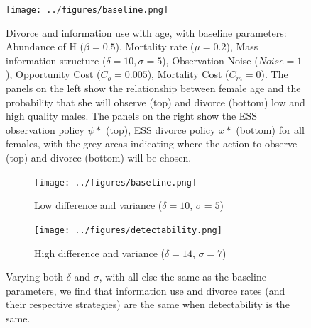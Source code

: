 \documentclass[10pt]{article} %
\begin{document}
\begin{figure}
\centering
\texttt{[image: ../figures/baseline.png]}
\caption{Divorce and information use with age, with baseline parameters: Abundance of H ($ \beta=0.5 $), Mortality rate ($ \mu=0.2 $), Mass information structure ($ \delta=10, \sigma=5 $), Observation Noise ($ Noise=1 $), Opportunity Cost ($ C_o=0.005 $), Mortality Cost ($ C_m=0 $). The panels on the left show the relationship between female age and the probability that she will observe (top) and divorce (bottom) low and high quality males. The panels on the right show the ESS observation policy $\psi*$ (top), ESS divorce policy $x*$ (bottom) for all females, with the grey areas indicating where the action to observe (top) and divorce (bottom) will be chosen.}
\label{fig:2}
\end{figure}

\begin{figure}
	\centering
	\begin{subfigure}{.5\textwidth}
		\centering
		\caption{Low difference and variance ($\delta = 10$, $\sigma = 5 $)}
		\texttt{[image: ../figures/baseline.png]}
		\label{fig:sub3}%
	\end{subfigure}%
	\begin{subfigure}{.5\textwidth}
		\centering
		\caption{High difference and variance ($\delta = 14$, $\sigma = 7 $)}
		\texttt{[image: ../figures/detectability.png]}
		\label{fig:sub4}
	\end{subfigure}%
	\caption{Varying both $\delta$ and $\sigma$, with all else the same as the baseline parameters, we find that information use and divorce rates (and their respective strategies) are the same when detectability is the same.}
	\label{fig:4}%
\end{figure}
\end{document}
